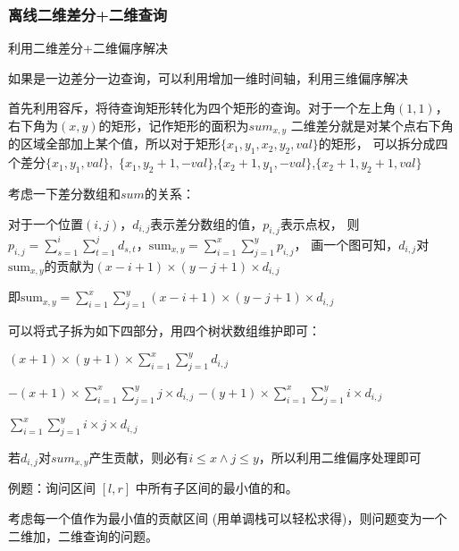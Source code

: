 \documentclass[a4paper, fontset=none]{ctexart}
\begin{document}
\subsubsection{离线二维差分+二维查询}

利用二维差分+二维偏序解决

如果是一边差分一边查询，可以利用增加一维时间轴，利用三维偏序解决

首先利用容斥，将待查询矩形转化为四个矩形的查询。对于一个左上角$(1, 1)$，右下角为$(x, y)$的矩形，记作矩形的面积为$sum_{x, y}$
二维差分就是对某个点右下角的区域全部加上某个值，所以对于矩形$\{x_1, y_1, x_2, y_2, val\}$的矩形，
可以拆分成四个差分$\{x_1, y_1, val\}$,\ $\{x_1, y_2+1,-val\}$,$\{x_2+1, y_1,-val\}$,$\{x_2+1, y_2+1, val\}$

考虑一下差分数组和$sum$的关系：

对于一个位置$(i, j)$，$d_{i, j}$表示差分数组的值，$p_{i, j}$表示点权，
则$p_{i, j}=\sum_{s=1}^{i}\sum_{t=1}^{j}d_{s, t}$，$\text{sum}_{x, y}=\sum_{i=1}^{x}\sum_{j=1}^{y}p_{i, j}$，
画一个图可知，$d_{i, j}$对$\text{sum}_{x, y}$的贡献为$(x-i+1)\times(y-j+1)\times d_{i, j}$

即$\text{sum}_{x, y}=\sum_{i=1}^{x}\sum_{j=1}^{y}(x-i+1)\times (y-j+1)\times d_{i, j}$

可以将式子拆为如下四部分，用四个树状数组维护即可：

$(x+1)\times (y+1)\times \sum_{i=1}^x\sum_{j=1}^y d_{i, j}$

$-(x+1)\times \sum_{i=1}^x\sum_{j=1}^y j\times d_{i, j}$
$-(y+1)\times \sum_{i=1}^x\sum_{j=1}^y i\times d_{i, j}$

$\sum_{i=1}^x\sum_{j=1}^y i\times j\times d_{i, j}$

若$d_{i, j}$对$sum_{x, y}$产生贡献，则必有$i\leqslant x\land j\leqslant y$，所以利用二维偏序处理即可

例题：询问区间 $[l, r]$ 中所有子区间的最小值的和。

考虑每一个值作为最小值的贡献区间 (用单调栈可以轻松求得)，则问题变为一个二维加，二维查询的问题。
\end{document}
